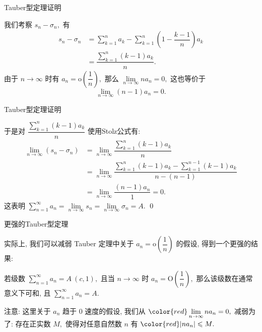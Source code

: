 
\begin{frame}{Tauber型定理证明}

我们考察 $s_n - \sigma_n,$
\pause
有
\begin{align*}
  s_n - \sigma_n & = \sum\limits_{k=1}^n a_k - \sum\limits_{k=1}^n \left( 1 - \dfrac{k-1}{n} \right) a_k \\
  & = \dfrac{\sum\limits_{k=1}^n (k-1)a_k}{n}.
\end{align*}
\pause
由于 $n \to \infty$ 时有 $a_n = \mathrm{o}\left( \dfrac{1}{n} \right),$ 那么 $\lim\limits_{n \to \infty} n a_n = 0,$ 这也等价于
$$\lim\limits_{n \to \infty} (n - 1) a_n = 0.$$

\end{frame}


\begin{frame}{Tauber型定理证明}

于是对 $\dfrac{\sum\limits_{k=1}^n (k-1)a_k}{n}$ 使用Stolz公式有:
\begin{align*}
  \lim\limits_{n \to \infty} (s_n - \sigma_n) & = \lim\limits_{n \to \infty} \dfrac{\sum\limits_{k=1}^n (k-1)a_k}{n} \\
  & = \lim\limits_{n \to \infty} \dfrac{\sum\limits_{k=1}^n (k-1)a_k - \sum\limits_{k=1}^{n-1} (k-1)a_k}{n - (n-1)} \\
  & = \lim\limits_{n \to \infty} \dfrac{(n-1)a_n}{1} = 0.
\end{align*}
这表明 $\sum\limits_{n=1}^{\infty} a_n = \lim\limits_{n \to \infty} s_n = \lim\limits_{n \to \infty} \sigma_n = A.$ \qed

\end{frame}


\begin{frame}{更强的Tauber型定理}

实际上, 我们可以减弱 Tauber 定理中关于 $a_n = \mathrm{o} \left( \dfrac{1}{n} \right)$ 的假设, 得到一个更强的结果:

\begin{thm}
  若级数 $\sum\limits_{n=1}^{\infty} a_n = A~(c, 1),$ 且当 $n\to\infty$ 时 $a_n = \mathrm{O} \left( \dfrac{1}{n} \right),$ 那么该级数在通常意义下可和, 且 $\sum\limits_{n=1}^{\infty} a_n = A.$
\end{thm}

\vspace*{1em}

注意: 这里关于 $a_n$ 趋于 $0$ 速度的假设, 我们从 ${\color{red} \lim\limits_{n\to\infty} n a_n = 0},$ 减弱为了: 存在正实数 $M,$ 使得对任意自然数 $n$ 有 ${\color{red} \rvert n a_n \rvert \leqslant M}.$

\end{frame}

